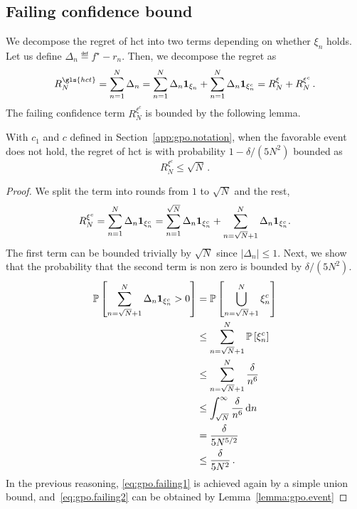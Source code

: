 \subsection{Failing confidence bound}\label{proof:lemma_failing}

We decompose the regret of \gls{hct} into two terms depending on whether $\xi_n$ holds. Let us define $\Delta_n \eqdef f^\star - r_n$. Then, we decompose the regret as
\[
    R_N^{\gls{hct}} = \sum_{n=1}^N \Delta_n = \sum_{n=1}^N \Delta_n \bOne_{\xi_n} + \sum_{n=1}^N \Delta_n \bOne_{\xi_n^c} = R_N^{\xi} + R_N^{\xi^c}\,.
\]
The failing confidence term $R_N^{\xi^c}$ is bounded by the following lemma.
\begin{lemma}\label{lemma:gpo.failing}
\begin{leftbar}[lemmabar]
With $c_1$ and $c$ defined in Section~\ref{app:gpo.notation}, when the favorable event does not hold, the regret of {\gls{hct}} is with probability $1-\delta/(5N^2)$ bounded as
\[
    R_N^{\xi^c} \leq \sqrt{N}\,.
\]
\end{leftbar}
\end{lemma}

\begin{proof}
We split the term into rounds from $1$ to $\sqrt{N}$ and the rest,
\[
R_N^{\xi^c} = \sum_{n=1}^N \Delta_n {\bf 1}_{\xi_n^c} = \sum_{n=1}^{\sqrt{N}} \Delta_n {\bf 1}_{\xi_n^c} + \sum_{n=\sqrt{N}+1}^N \Delta_n {\bf 1}_{\xi_n^c}.
\]
The first term can be bounded trivially by $\sqrt{N}$ since $|\Delta_n|\leq 1$. Next, we show that the probability that the second term is non zero is bounded by $\delta/(5N^2)$.
\begingroup
\allowdisplaybreaks
\begin{align}
    \mathbb{P}\left[ \sum_{n=\sqrt{N}+1}^N \Delta_n {\bf 1}_{\xi_n^c} > 0 \right] & = \mathbb{P}\left[ \bigcup\limits_{n=\sqrt{N}+1}^N \xi_n^c \right] \nonumber \\
            & \leq \sum_{n=\sqrt{N}+1}^N \mathbb{P}\left[ \xi_n^c \right] \label{eq:gpo.failing1} \\
            & \leq \sum_{n=\sqrt{N}+1}^N \frac{\delta}{n^6} \label{eq:gpo.failing2} \\
            & \leq \int_{\sqrt{N}}^{\infty} \frac{\delta}{n^6} \, \mathrm{d}n \nonumber \\
            & = \frac{\delta}{5N^{5/2}} \nonumber \\
            & \leq \frac{\delta}{5N^2} \nonumber \,.
\end{align}
\endgroup
In the previous reasoning, \eqref{eq:gpo.failing1} is achieved again by a simple union bound, and~\eqref{eq:gpo.failing2} can be obtained by Lemma~\ref{lemma:gpo.event}
\end{proof}

